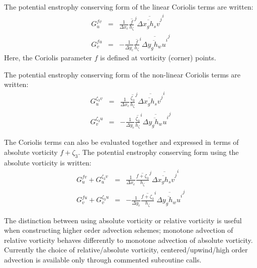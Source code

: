The potential enstrophy conserving form of the linear Coriolis terms
are written:
\begin{eqnarray}
G_u^{fv} & = &
\frac{1}{\Delta x_c}
\overline{ \frac{f}{h_\zeta} }^j \overline{ \overline{ \Delta x_g h_s v }^j }^i \\
G_v^{fu} & = & -
\frac{1}{\Delta y_c}
\overline{ \frac{f}{h_\zeta} }^i \overline{ \overline{ \Delta y_g h_w u }^i }^j
\end{eqnarray}
Here, the Coriolis parameter $f$ is defined at vorticity (corner)
points.

The potential enstrophy conserving form of the non-linear Coriolis
terms are written:
\begin{eqnarray}
G_u^{\zeta_3 v} & = &
\frac{1}{\Delta x_c}
\overline{ \frac{\zeta_3}{h_\zeta} }^j \overline{ \overline{ \Delta x_g h_s v }^j }^i \\
G_v^{\zeta_3 u} & = & -
\frac{1}{\Delta y_c}
\overline{ \frac{\zeta_3}{h_\zeta} }^i \overline{ \overline{ \Delta y_g h_w u }^i }^j
\end{eqnarray}

The Coriolis terms can also be evaluated together and expressed in
terms of absolute vorticity $f+\zeta_3$. The potential enstrophy
conserving form using the absolute vorticity is written:
\begin{eqnarray}
G_u^{fv} + G_u^{\zeta_3 v} & = &
\frac{1}{\Delta x_c}
\overline{ \frac{f + \zeta_3}{h_\zeta} }^j \overline{ \overline{ \Delta x_g h_s v }^j }^i \\
G_v^{fu} + G_v^{\zeta_3 u} & = & -
\frac{1}{\Delta y_c}
\overline{ \frac{f + \zeta_3}{h_\zeta} }^i \overline{ \overline{ \Delta y_g h_w u }^i }^j
\end{eqnarray}

 The
distinction between using absolute vorticity or relative vorticity is
useful when constructing higher order advection schemes; monotone
advection of relative vorticity behaves differently to monotone
advection of absolute vorticity. Currently the choice of
relative/absolute vorticity, centered/upwind/high order advection is
available only through commented subroutine calls.



